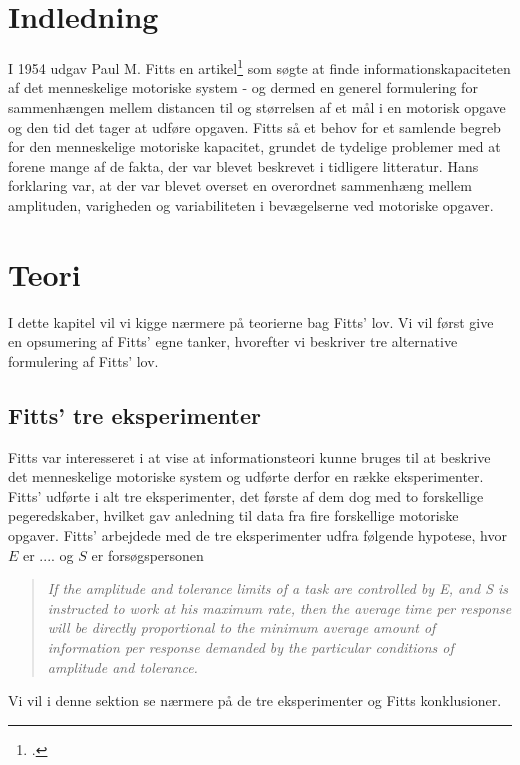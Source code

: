 



\chapter*{Indledning}
I 1954 udgav Paul M. Fitts en artikel\footcite{fitts1954} som søgte at finde informationskapaciteten af det menneskelige motoriske system - og dermed en generel formulering for sammenhængen mellem distancen til og størrelsen af et mål i en motorisk opgave og den tid det tager at udføre opgaven. Fitts så et behov for et samlende begreb for den menneskelige motoriske kapacitet, grundet de tydelige problemer med at forene mange af de fakta, der var blevet beskrevet i tidligere litteratur. Hans forklaring var, at der var blevet overset en overordnet sammenhæng mellem amplituden, varigheden og variabiliteten i bevægelserne ved motoriske opgaver.


\chapter*{Teori}
I dette kapitel vil vi kigge nærmere på teorierne bag Fitts' lov. Vi vil først give en opsumering af Fitts' egne tanker, hvorefter vi beskriver tre alternative formulering af Fitts' lov.

\section*{Fitts' tre eksperimenter}
Fitts var interesseret i at vise at informationsteori kunne bruges til at beskrive det menneskelige motoriske system og udførte derfor en række eksperimenter\cite{fitts1954}. Fitts' udførte i alt tre eksperimenter, det første af dem dog med to forskellige pegeredskaber, hvilket gav anledning til data fra fire forskellige motoriske opgaver. Fitts' arbejdede med de tre eksperimenter udfra følgende hypotese, hvor $E$ er .... og $S$ er forsøgspersonen
\begin{quotation}
\textit{If the amplitude and tolerance limits of a task are controlled by E, and S is instructed to work at his maximum rate, then the average time per response will be directly proportional to the minimum average amount of information per response demanded by the particular conditions of amplitude and tolerance.}
\end{quotation}
Vi vil i denne sektion se nærmere på de tre eksperimenter og Fitts konklusioner.

